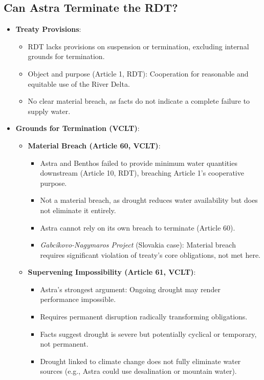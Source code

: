 \subsection{Can Astra Terminate the RDT?}
\begin{itemize}
    \item \textbf{Treaty Provisions}:
    \begin{itemize}
        \item RDT lacks provisions on suspension or termination, excluding internal grounds for termination.
        \item Object and purpose (Article 1, RDT): Cooperation for reasonable and equitable use of the River Delta.
        \item No clear material breach, as facts do not indicate a complete failure to supply water.
    \end{itemize}
    \item \textbf{Grounds for Termination (VCLT)}:
    \begin{itemize}
        \item \textbf{Material Breach (Article 60, VCLT)}:
        \begin{itemize}
            \item Astra and Benthos failed to provide minimum water quantities downstream (Article 10, RDT), breaching Article 1’s cooperative purpose.
            \item Not a material breach, as drought reduces water availability but does not eliminate it entirely.
            \item Astra cannot rely on its own breach to terminate (Article 60).
            \item \textit{Gabcíkovo-Nagymaros Project} (Slovakia case): Material breach requires significant violation of treaty’s core obligations, not met here.
        \end{itemize}
        \item \textbf{Supervening Impossibility (Article 61, VCLT)}:
        \begin{itemize}
            \item Astra’s strongest argument: Ongoing drought may render performance impossible.
            \item Requires permanent disruption radically transforming obligations.
            \item Facts suggest drought is severe but potentially cyclical or temporary, not permanent.
            \item Drought linked to climate change does not fully eliminate water sources (e.g., Astra could use desalination or mountain water).

\end{itemize}
\end{itemize}
\end{itemize}
